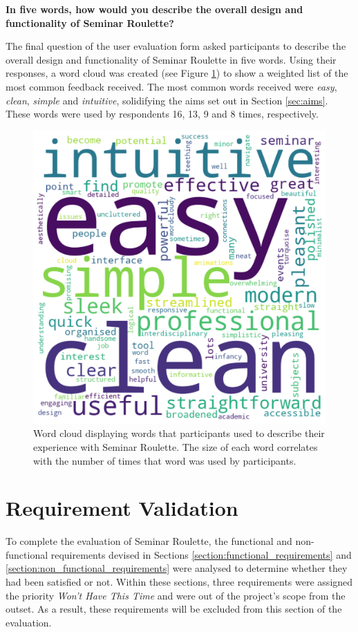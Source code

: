 \documentclass{l4proj}
\begin{document}
\textbf{In five words, how would you describe the overall design and functionality of Seminar Roulette?}

The final question of the user evaluation form asked participants to describe the overall design and functionality of Seminar Roulette in five words. Using their responses, a word cloud was created (see Figure \ref{fig:word_cloud}) to show a weighted list of the most common feedback received. The most common words received were \emph{easy}, \emph{clean}, \emph{simple} and \emph{intuitive}, solidifying the aims set out in Section \ref{sec:aims}. These words were used by respondents 16, 13, 9 and 8 times, respectively.

\begin{figure}[htb]
    \centering
    \includegraphics[width=0.6\linewidth]{images/word_cloud.pdf}    
    \caption{Word cloud displaying words that participants used to describe their experience with Seminar Roulette. The size of each word correlates with the number of times that word was used by participants.}
    \label{fig:word_cloud} 
\end{figure}

\section{Requirement Validation}

To complete the evaluation of Seminar Roulette, the functional and non-functional requirements devised in Sections \ref{section:functional_requirements} and \ref{section:non_functional_requirements} were analysed to determine whether they had been satisfied or not. Within these sections, three requirements were assigned the priority \emph{Won't Have This Time} and were out of the project's scope from the outset. As a result, these requirements will be excluded from this section of the evaluation.
\end{document}
